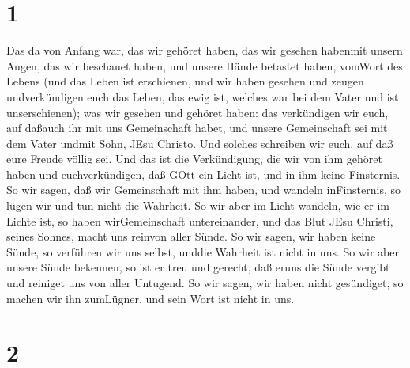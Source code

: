 \hypertarget{section}{%
\section{1}\label{section}}

 Das da von Anfang war, das wir gehöret haben, das wir
gesehen habenmit unsern Augen, das wir beschauet haben, und unsere Hände
betastet haben, vomWort des Lebens  (und das Leben ist
erschienen, und wir haben gesehen und zeugen undverkündigen euch das
Leben, das ewig ist, welches war bei dem Vater und ist unserschienen);
 was wir gesehen und gehöret haben: das verkündigen wir
euch, auf daßauch ihr mit uns Gemeinschaft habet, und unsere
Gemeinschaft sei mit dem Vater undmit Sohn, JEsu Christo. 
Und solches schreiben wir euch, auf daß eure Freude völlig sei.
 Und das ist die Verkündigung, die wir von ihm gehöret haben
und euchverkündigen, daß GOtt ein Licht ist, und in ihm keine
Finsternis.  So wir sagen, daß wir Gemeinschaft mit ihm
haben, und wandeln inFinsternis, so lügen wir und tun nicht die
Wahrheit.  So wir aber im Licht wandeln, wie er im Lichte
ist, so haben wirGemeinschaft untereinander, und das Blut JEsu Christi,
seines Sohnes, macht uns reinvon aller Sünde.  So wir sagen,
wir haben keine Sünde, so verführen wir uns selbst, unddie Wahrheit ist
nicht in uns.  So wir aber unsere Sünde bekennen, so ist er
treu und gerecht, daß eruns die Sünde vergibt und reiniget uns von aller
Untugend.  So wir sagen, wir haben nicht gesündiget, so
machen wir ihn zumLügner, und sein Wort ist nicht in uns.

\hypertarget{section-1}{%
\section{2}\label{section-1}}

